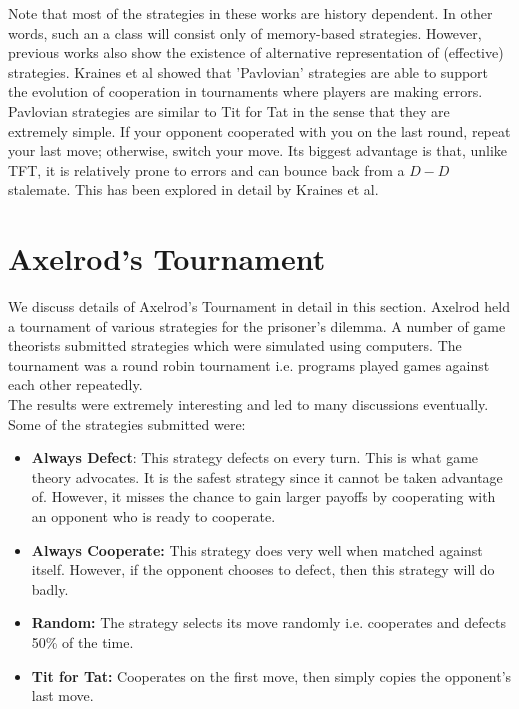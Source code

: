 \documentclass[a4paper]{article}
\begin{document}
	Note that most of the strategies in these works are history dependent. In other words, such an a class will consist only of memory-based strategies. However, previous works \cite{pavlov} also show the existence of alternative representation of (effective) strategies. Kraines et al \cite{pavlov} showed that 'Pavlovian' strategies are able to support the evolution of cooperation in tournaments where players are making errors. Pavlovian strategies are similar to Tit for Tat in the sense that they are extremely simple. If your opponent cooperated with you on the last round, repeat your last move; otherwise, switch your move. Its biggest advantage is that, unlike TFT, it is relatively prone to errors and can bounce back from a $D-D$ stalemate. This has been explored in detail by Kraines et al.
	
	\section{Axelrod's Tournament}

	We discuss details of Axelrod's Tournament \cite{axelrod} in detail in this section. Axelrod held a tournament of various strategies for the prisoner's dilemma. A number of game theorists submitted strategies which were simulated using computers. The tournament was a round robin tournament i.e. programs played games against each other repeatedly.\\
	The results were extremely interesting and led to many discussions eventually. Some of the strategies submitted were:
	\begin{itemize}
	\item \textbf{Always Defect}: This strategy defects on every turn. This is what game theory advocates. It is the safest strategy since it cannot be taken advantage of. However, it misses the chance to gain larger payoffs by cooperating with an opponent who is ready to cooperate.
	\item \textbf{Always Cooperate:} This strategy does very well when matched against itself. However, if the opponent chooses to defect, then this strategy will do badly.
	\item \textbf{Random:} The strategy selects its move randomly i.e. cooperates and defects 50\% of the time.
	\item \textbf{Tit for Tat:} Cooperates on the first move, then simply copies the opponent's last move.
	\end{itemize}
	
\end{document}
